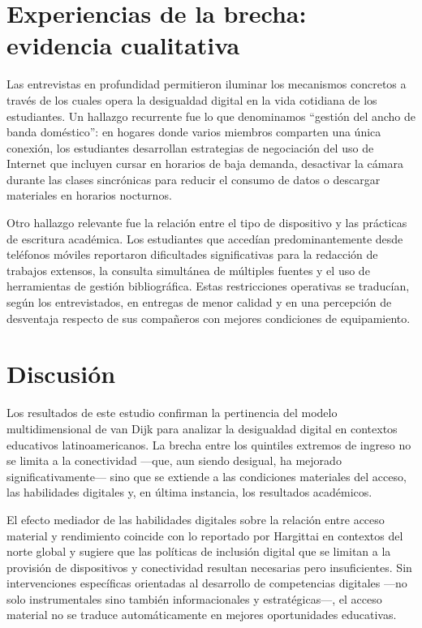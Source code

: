 \section{Experiencias de la brecha: evidencia cualitativa}
Las entrevistas en profundidad permitieron iluminar los mecanismos concretos a través de los cuales opera la desigualdad digital en la vida cotidiana de los estudiantes. Un hallazgo recurrente fue lo que denominamos “gestión del ancho de banda doméstico”: en hogares donde varios miembros comparten una única conexión, los estudiantes desarrollan estrategias de negociación del uso de Internet que incluyen cursar en horarios de baja demanda, desactivar la cámara durante las clases sincrónicas para reducir el consumo de datos o descargar materiales en horarios nocturnos.

Otro hallazgo relevante fue la relación entre el tipo de dispositivo y las prácticas de escritura académica. Los estudiantes que accedían predominantemente desde teléfonos móviles reportaron dificultades significativas para la redacción de trabajos extensos, la consulta simultánea de múltiples fuentes y el uso de herramientas de gestión bibliográfica. Estas restricciones operativas se traducían, según los entrevistados, en entregas de menor calidad y en una percepción de desventaja respecto de sus compañeros con mejores condiciones de equipamiento.


\section{Discusión}
Los resultados de este estudio confirman la pertinencia del modelo multidimensional de van Dijk \autocite{2563-VANDIJK2020} para analizar la desigualdad digital en contextos educativos latinoamericanos. La brecha entre los quintiles extremos de ingreso no se limita a la conectividad —que, aun siendo desigual, ha mejorado significativamente— sino que se extiende a las condiciones materiales del acceso, las habilidades digitales y, en última instancia, los resultados académicos.

El efecto mediador de las habilidades digitales sobre la relación entre acceso material y rendimiento coincide con lo reportado por Hargittai \autocite{2565-HARGITTAI2002} en contextos del norte global y sugiere que las políticas de inclusión digital que se limitan a la provisión de dispositivos y conectividad resultan necesarias pero insuficientes. Sin intervenciones específicas orientadas al desarrollo de competencias digitales —no solo instrumentales sino también informacionales y estratégicas—, el acceso material no se traduce automáticamente en mejores oportunidades educativas.

